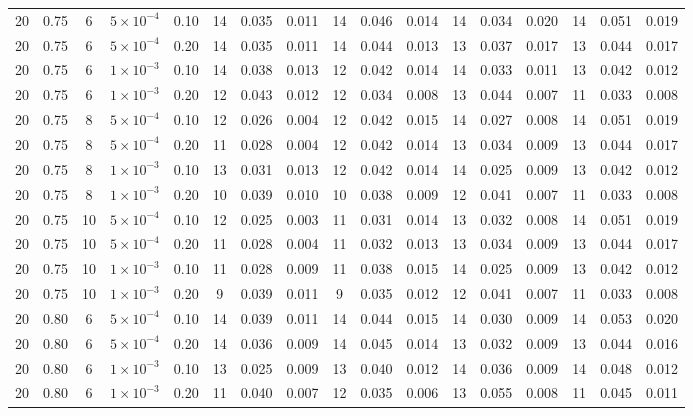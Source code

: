 \begin{longtable}{c c c c c c c c c c c c c c c c c }
20 & 0.75 & 6 & $5{\times}10^{-4}$ & 0.10 & 14 & 0.035 & 0.011 & 14 & 0.046 & 0.014 & 14 & 0.034 & 0.020 & 14 & 0.051 & 0.019 \\
20 & 0.75 & 6 & $5{\times}10^{-4}$ & 0.20 & 14 & 0.035 & 0.011 & 14 & 0.044 & 0.013 & 13 & 0.037 & 0.017 & 13 & 0.044 & 0.017 \\
20 & 0.75 & 6 & $1{\times}10^{-3}$ & 0.10 & 14 & 0.038 & 0.013 & 12 & 0.042 & 0.014 & 14 & 0.033 & 0.011 & 13 & 0.042 & 0.012 \\
20 & 0.75 & 6 & $1{\times}10^{-3}$ & 0.20 & 12 & 0.043 & 0.012 & 12 & 0.034 & 0.008 & 13 & 0.044 & 0.007 & 11 & 0.033 & 0.008 \\
20 & 0.75 & 8 & $5{\times}10^{-4}$ & 0.10 & 12 & 0.026 & 0.004 & 12 & 0.042 & 0.015 & 14 & 0.027 & 0.008 & 14 & 0.051 & 0.019 \\
20 & 0.75 & 8 & $5{\times}10^{-4}$ & 0.20 & 11 & 0.028 & 0.004 & 12 & 0.042 & 0.014 & 13 & 0.034 & 0.009 & 13 & 0.044 & 0.017 \\
20 & 0.75 & 8 & $1{\times}10^{-3}$ & 0.10 & 13 & 0.031 & 0.013 & 12 & 0.042 & 0.014 & 14 & 0.025 & 0.009 & 13 & 0.042 & 0.012 \\
20 & 0.75 & 8 & $1{\times}10^{-3}$ & 0.20 & 10 & 0.039 & 0.010 & 10 & 0.038 & 0.009 & 12 & 0.041 & 0.007 & 11 & 0.033 & 0.008 \\
20 & 0.75 & 10 & $5{\times}10^{-4}$ & 0.10 & 12 & 0.025 & 0.003 & 11 & 0.031 & 0.014 & 13 & 0.032 & 0.008 & 14 & 0.051 & 0.019 \\
20 & 0.75 & 10 & $5{\times}10^{-4}$ & 0.20 & 11 & 0.028 & 0.004 & 11 & 0.032 & 0.013 & 13 & 0.034 & 0.009 & 13 & 0.044 & 0.017 \\
20 & 0.75 & 10 & $1{\times}10^{-3}$ & 0.10 & 11 & 0.028 & 0.009 & 11 & 0.038 & 0.015 & 14 & 0.025 & 0.009 & 13 & 0.042 & 0.012 \\
20 & 0.75 & 10 & $1{\times}10^{-3}$ & 0.20 & 9 & 0.039 & 0.011 & 9 & 0.035 & 0.012 & 12 & 0.041 & 0.007 & 11 & 0.033 & 0.008 \\
20 & 0.80 & 6 & $5{\times}10^{-4}$ & 0.10 & 14 & 0.039 & 0.011 & 14 & 0.044 & 0.015 & 14 & 0.030 & 0.009 & 14 & 0.053 & 0.020 \\
20 & 0.80 & 6 & $5{\times}10^{-4}$ & 0.20 & 14 & 0.036 & 0.009 & 14 & 0.045 & 0.014 & 13 & 0.032 & 0.009 & 13 & 0.044 & 0.016 \\
20 & 0.80 & 6 & $1{\times}10^{-3}$ & 0.10 & 13 & 0.025 & 0.009 & 13 & 0.040 & 0.012 & 14 & 0.036 & 0.009 & 14 & 0.048 & 0.012 \\
20 & 0.80 & 6 & $1{\times}10^{-3}$ & 0.20 & 11 & 0.040 & 0.007 & 12 & 0.035 & 0.006 & 13 & 0.055 & 0.008 & 11 & 0.045 & 0.011 \\

\end{longtable}
